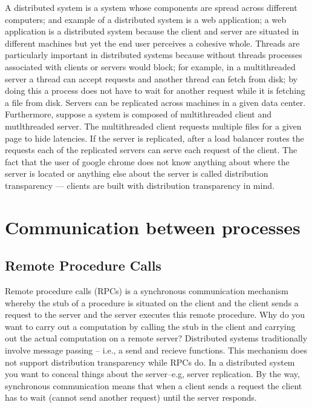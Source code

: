 \documentclass{amsbook}
\begin{document}
A distributed system is a system whose components are spread across different computers; and example of a distributed system is a web application; a web application is a distributed system because the client and server are situated in different machines but yet the end user perceives a cohesive whole. Threads are particularly important in distributed systems because without threads processes associated with clients or servers would block; for example, in a multithreaded server a thread can accept requests and another thread can fetch from disk; by doing this a process does not have to wait for another request while it is fetching a file from disk. Servers can be replicated across machines in a given data center. Furthermore, suppose a system is composed of multithreaded client and mutlthreaded server. The multithreaded client requests multiple files for a given page to hide latencies. If the server is replicated, after a load balancer routes the requests each of the replicated servers can serve each request of the client. The fact that the user of google chrome does not know anything about where the server is located or anything else about the server is called distribution transparency --- clients are built with distribution transparency in mind.

\section{Communication between processes}

\subsection{Remote Procedure Calls}

Remote procedure calls (RPCs) is a synchronous communication mechanism whereby the stub of a procedure is situated on the client and the client sends a request to the server and the server executes this remote procedure. Why do you want to carry out a computation by calling the stub in the client and carrying out the actual computation on a remote server? Distributed systems traditionally involve message passing -- i.e., a send and recieve functions. This mechanism does not support distribution transparency while RPCs do. In a distributed system you want to conceal things about the server--e.g, server replication. By the way, synchronous communication means that when a client sends a request the client has to wait (cannot send another request) until the server responds.
\end{document}
